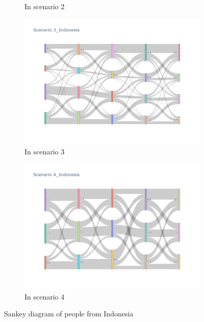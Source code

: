 \begin{figure}[h]
\begin{subfigure}{0.5\textwidth}
    \caption{In scenario 2}
    \label{fig32b}
  \end{subfigure}
  \begin{subfigure}{0.5\textwidth}
    \centering
    \includegraphics[width=\linewidth]{Figure/figure32c.png}
    \caption{In scenario 3}
    \label{fig32c}
  \end{subfigure}
  \begin{subfigure}{0.5\textwidth}
    \centering
    \includegraphics[width=\linewidth]{Figure/figure32d.png}
    \caption{In scenario 4}
    \label{fig32d}
  \end{subfigure}
  \caption{ Sankey diagram of people from Indonesia }
  \label{fig32}
\end{figure}

